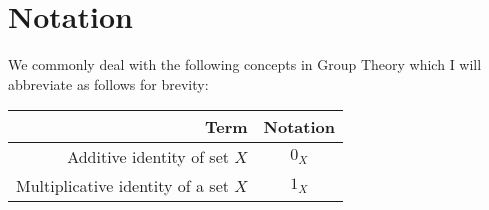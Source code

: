 \section{Notation}

We commonly deal with the following concepts in Group Theory
which I will abbreviate as follows for brevity:
\begin{center}
    \begin{tabular}{ | r | c | }
        \hline
        Term & Notation \\
        \hline \hline
        Additive identity of set $X$ & $0_X$ \\
        Multiplicative identity of a set $X$ & $1_X$ \\
        \hline
    \end{tabular}
\end{center}
